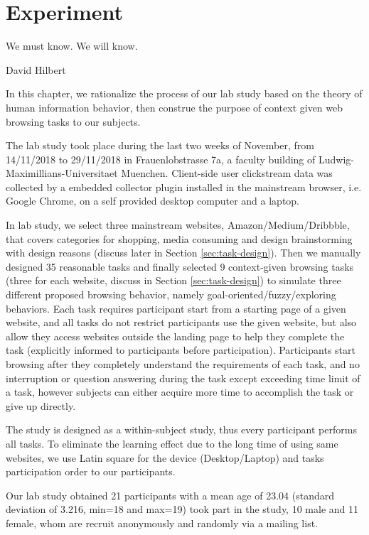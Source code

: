 \section{Experiment}
\label{ch:exp}

\epigraph{We must know. We will know.}{David Hilbert}

In this chapter, we rationalize the process of our lab study based on the theory of
human information behavior, then construe 
the purpose of context given web browsing tasks to our subjects.

The lab study took place during the last two weeks of November, from 14/11/2018 to 29/11/2018
in Frauenlobstrasse 7a, a faculty building of Ludwig-Maximillians-Universitaet Muenchen.
Client-side user clickstream data was collected by a embedded collector plugin installed in 
the mainstream browser, i.e. Google Chrome, on a self provided desktop computer and a laptop.

In lab study, we select three mainstream websites, Amazon/Medium/Dribbble, 
that covers categories for shopping, media consuming and design brainstorming with design 
reasons (discuss later in Section \ref{sec:task-design}).
Then we manually designed 35 reasonable tasks and finally selected 9 
context-given browsing tasks (three for each website, discuss in 
Section \ref{sec:task-design}) to simulate three different proposed browsing behavior,
namely goal-oriented/fuzzy/exploring behaviors.
Each task requires participant start from a starting page of a given website, and
all tasks do not restrict participants use the given website, but also allow they 
access websites outside the landing page to help they complete the task (explicitly informed to 
participants before participation).
Participants start browsing after they completely understand the requirements of 
each task, and no interruption or question answering during the task
except exceeding time limit of a task, however subjects can either acquire more time 
to accomplish the task or give up directly.

The study is designed as a within-subject study, thus every participant performs all tasks. 
To eliminate the learning effect due to the long time of using same websites, 
we use Latin square \cite{cochran1950experimental} 
for the device (Desktop/Laptop) and tasks participation order to our participants.

Our lab study obtained 21 participants with a mean age of 23.04 (standard deviation of 3.216, min=18 and max=19) 
took part in the study, 10 male and 11 female, whom are recruit anonymously and 
randomly via a mailing list.

